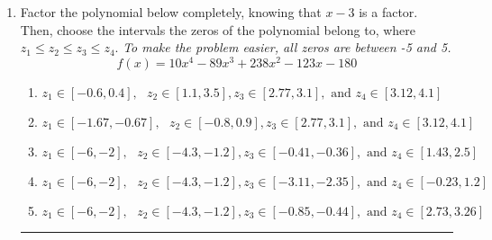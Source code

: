 \documentclass[14pt]{extbook}
\newcommand{\litem}[1]{\item#1\hspace*{-1cm}\rule{\textwidth}{0.4pt}}
\begin{document}
\begin{enumerate}
{\begin{enumerate}[label=\Alph*.]
\end{enumerate} }
\litem{
Factor the polynomial below completely, knowing that $x-3$ is a factor. Then, choose the intervals the zeros of the polynomial belong to, where $z_1 \leq z_2 \leq z_3 \leq z_4$. \textit{To make the problem easier, all zeros are between -5 and 5.}\[ f(x) = 10x^{4} -89 x^{3} +238 x^{2} -123 x -180 \]\begin{enumerate}[label=\Alph*.]
\item \( z_1 \in [-0.6, 0.4], \text{   }  z_2 \in [1.1, 3.5], z_3 \in [2.77, 3.1], \text{   and   } z_4 \in [3.12, 4.1] \)
\item \( z_1 \in [-1.67, -0.67], \text{   }  z_2 \in [-0.8, 0.9], z_3 \in [2.77, 3.1], \text{   and   } z_4 \in [3.12, 4.1] \)
\item \( z_1 \in [-6, -2], \text{   }  z_2 \in [-4.3, -1.2], z_3 \in [-0.41, -0.36], \text{   and   } z_4 \in [1.43, 2.5] \)
\item \( z_1 \in [-6, -2], \text{   }  z_2 \in [-4.3, -1.2], z_3 \in [-3.11, -2.35], \text{   and   } z_4 \in [-0.23, 1.2] \)
\item \( z_1 \in [-6, -2], \text{   }  z_2 \in [-4.3, -1.2], z_3 \in [-0.85, -0.44], \text{   and   } z_4 \in [2.73, 3.26] \)

\end{enumerate} }
\end{enumerate}
\end{document}
